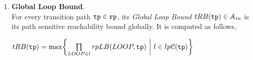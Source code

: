 \begin{enumerate}
\item \textbf{Global Loop Bound}.
\\
For every transition path $\mathtt{tp} \in \mathtt{rp}$, its \emph{Global Loop Bound} $tRB(\mathtt{tp}) \in \mathcal{A}_{in}$ is 
its path sensitive reachability bound globally. It is computed as follows,
\begin{defn}
  \label{def:global_loop_bound}
$tRB(\tpath) = \max
\left \{ \prod\limits_{LOOP \in l} rpLB(LOOP, \tpath)
~ \middle\vert~ l \in lp\mathcal{C}(\tpath) \right\}$
\end{defn}
\end{enumerate}

